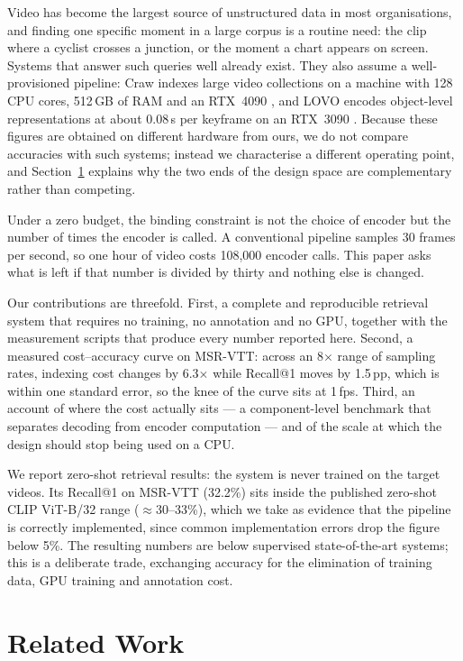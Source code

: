 \documentclass[journal]{IEEEtran}
\begin{document}
Video has become the largest source of unstructured data in most organisations, and
finding one specific moment in a large corpus is a routine need: the clip where a cyclist
crosses a junction, or the moment a chart appears on screen. Systems that answer such
queries well already exist. They also assume a well-provisioned pipeline: Craw indexes
large video collections on a machine with 128 CPU cores, 512\,GB of RAM and an RTX~4090
\cite{craw2026}, and LOVO encodes object-level representations at about 0.08\,s per
keyframe on an RTX~3090 \cite{lovo2025}. Because these figures are obtained on different
hardware from ours, we do not compare accuracies with such systems; instead we characterise
a different operating point, and Section~\ref{sec:related} explains why the two ends of the
design space are complementary rather than competing.

Under a zero budget, the binding constraint is not the choice of encoder but the number of
times the encoder is called. A conventional pipeline samples 30 frames per second, so one
hour of video costs 108{,}000 encoder calls. This paper asks what is left if that number is
divided by thirty and nothing else is changed.

Our contributions are threefold. First, a complete and reproducible retrieval system that
requires no training, no annotation and no GPU, together with the measurement scripts that
produce every number reported here. Second, a measured cost--accuracy curve on MSR-VTT:
across an 8$\times$ range of sampling rates, indexing cost changes by 6.3$\times$ while
Recall@1 moves by 1.5\,pp, which is within one standard error, so the knee of the curve sits
at 1\,fps. Third, an account of where the cost actually sits --- a component-level benchmark
that separates decoding from encoder computation --- and of the scale at which the design
should stop being used on a CPU.

We report zero-shot retrieval results: the system is never trained on the target videos. Its
Recall@1 on MSR-VTT (32.2\%) sits inside the published zero-shot CLIP ViT-B/32 range
($\approx$30--33\%), which we take as evidence that the pipeline is correctly implemented,
since common implementation errors drop the figure below 5\%. The resulting numbers are below
supervised state-of-the-art systems; this is a deliberate trade, exchanging accuracy for the
elimination of training data, GPU training and annotation cost.

\section{Related Work}\label{sec:related}
\end{document}
